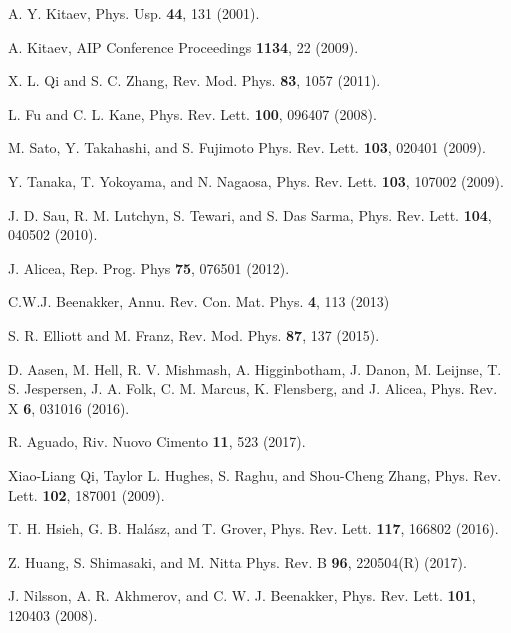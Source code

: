\documentclass[aps,prl,twocolumn,showpacs,showpacs,10pt,superscriptaddress]{revtex4-1}
\begin{document}
\begin{thebibliography}{00}

 A. Y. Kitaev, Phys. Usp. \textbf{44}, 131 (2001).

	A. Kitaev, AIP Conference Proceedings \textbf{1134}, 22 (2009).

 X. L. Qi and S. C. Zhang, Rev. Mod. Phys. \textbf{83}, 1057 (2011).


	L. Fu and C. L. Kane, Phys. Rev. Lett. \textbf{100}, 096407 (2008).

 M. Sato, Y. Takahashi, and S. Fujimoto Phys. Rev. Lett. \textbf{103}, 020401 (2009).

 Y. Tanaka, T. Yokoyama, and N. Nagaosa, Phys. Rev. Lett. \textbf{103}, 107002 (2009).

 J. D. Sau, R. M. Lutchyn, S. Tewari, and S. Das Sarma, Phys. Rev. Lett. \textbf{104}, 040502 (2010).

 J. Alicea, Rep. Prog. Phys \textbf{75}, 076501 (2012).

 C.W.J. Beenakker, Annu. Rev. Con. Mat. Phys. \textbf{4}, 113 (2013)

 S. R. Elliott and M. Franz, Rev. Mod. Phys. \textbf{87}, 137 (2015).

	D. Aasen, M. Hell, R. V. Mishmash, A. Higginbotham, J. Danon, M. Leijnse, T. S. Jespersen, J. A. Folk, C. M. Marcus, K. Flensberg, and J. Alicea, Phys. Rev. X \textbf{6}, 031016 (2016).


 R. Aguado, Riv. Nuovo Cimento \textbf{11}, 523 (2017).


 Xiao-Liang Qi, Taylor L. Hughes, S. Raghu, and Shou-Cheng Zhang, Phys. Rev. Lett. \textbf{102}, 187001 (2009).

 T. H. Hsieh, G. B. Hal\'asz, and T. Grover, Phys. Rev. Lett. \textbf{117}, 166802 (2016).

 Z. Huang, S. Shimasaki, and M. Nitta Phys. Rev. B \textbf{96}, 220504(R) (2017).









	J. Nilsson, A. R. Akhmerov, and C. W. J. Beenakker, Phys. Rev. Lett. \textbf{101}, 120403 (2008).


\end{thebibliography}
\end{document}
